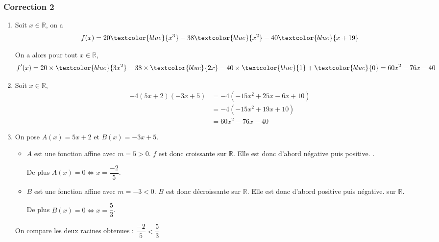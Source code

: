 \documentclass[15pt, mathserif]{beamer}
\newcommand{\R}{\mathbb{R}}			%
\begin{document}
\begin{frame}
\vspace{-10mm}
	\frametitle{Correction 2}
\begin{enumerate} 
 	 \item Soit $x \in \R$, on a $$f(x)=20\textcolor{blue}{x^3}-38\textcolor{blue}{x^2}-40\textcolor{blue}{x+19}$$
 
 On a alors pour tout $x \in  \R$, $$f'(x)= 20\times \textcolor{blue}{3x^2} -38\times \textcolor{blue}{2x}-40\times \textcolor{blue}{1}+\textcolor{blue}{0}=60x^2-76x-40$$
 	 \item Soit $x \in \R$, \begin{align*} 
 -4(5x+2)(-3x+5) & = -4\left( -15x^2 +25x -6x +10\right) \\ 
 &=  -4\left( -15x^2 +19x +10\right) \\ 
 &= 60x^2 -76x -40
 \end{align*} \end{enumerate} 
 
 \end{frame} 
 
 \begin{frame} 
 
 \begin{enumerate} 
 \setcounter{enumi}{2} 
 
 	 \item On pose $A(x)= 5x+2$ et $B(x) = -3x+5$.
 \bigskip 
 \begin{itemize}
	\item $A$ est une fonction affine avec $m =5>0$. $f$ est donc croissante sur $\mathbb{R}$. Elle est donc d'abord négative puis positive. .

	 De plus $A(x) = 0 \Leftrightarrow x = \dfrac{-2}{5}$. 
 \bigskip 
	\item $B$ est une fonction affine avec $m =-3<0$. $B$ est donc décroissante sur $\mathbb{R}$. Elle est donc d'abord positive puis négative. sur $\mathbb{R}$.

	 De plus $B(x) = 0 \Leftrightarrow x = \dfrac{5}{3}$.
\end{itemize}
 On compare les deux racines obtenues : $ \dfrac{-2}{5} < \dfrac{5}{3}$ 
 \end{enumerate} 
 
 \end{frame}
\end{document}
